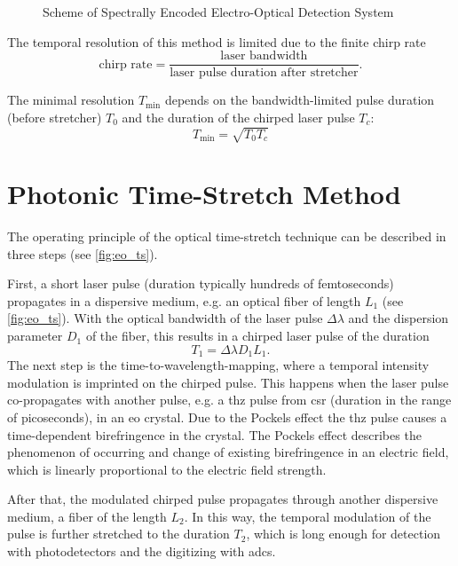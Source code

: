 \begin{figure}[H]
	\centering
	\resizebox{1\textwidth}{!}{}
	\caption{Scheme of Spectrally Encoded Electro-Optical Detection System \cite{roussel2014}}
	\label{fig:spectral_eo}
\end{figure}

The temporal resolution of this method is limited due to the finite chirp rate
\begin{equation}
	\text{chirp rate} = \frac{\text{laser bandwidth}}{\text{laser pulse duration after stretcher}}.
\end{equation}

The minimal resolution $T_{\text{min}}$ depends on the bandwidth-limited pulse duration (before stretcher) $T_0$ and the duration of the chirped laser pulse $T_c$:
\begin{equation}
	T_{\text{min}} = \sqrt{T_0 T_c}
\end{equation}


\section{Photonic Time-Stretch Method}
The operating principle of the optical time-stretch technique can be described in three steps (see \autoref{fig:eo_ts}).

First, a short laser pulse (duration typically hundreds of femtoseconds) propagates in a dispersive medium, e.g. an optical fiber of length $L_1$ (see \autoref{fig:eo_ts}).
With the optical bandwidth of the laser pulse $\Delta \lambda$ and the dispersion parameter $D_1$ of the fiber, this results in a chirped laser pulse of the duration
\begin{equation}
	T_1 = \Delta \lambda D_1 L_1.
\end{equation}
The next step is the time-to-wavelength-mapping, where a temporal intensity modulation is imprinted on the chirped pulse.
This happens when the laser pulse co-propagates with another pulse, e.g. a \gls{thz} pulse from \gls{csr} (duration in the range of picoseconds), in an \gls{eo} crystal. 
Due to the Pockels effect the \gls{thz} pulse causes a time-dependent birefringence in the crystal. 
The Pockels effect describes the phenomenon of occurring and change of existing birefringence in an electric field, which is linearly proportional to the electric field strength. \cite{pockels} 

After that, the modulated chirped pulse propagates through another dispersive medium, a fiber of the length $L_2$.
In this way, the temporal modulation of the pulse is further stretched to the duration $T_2$, which is long enough for detection with photodetectors and the digitizing with \Glspl{adc}. \cite{roussel2014} 

